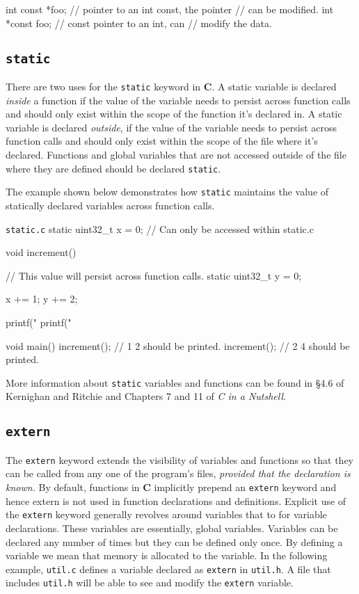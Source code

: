 \documentclass[11pt]{article}
\begin{document}
\begin{codelisting}{}
int const *foo; // pointer to an int const, the pointer 
                // can be modified.
int *const foo; // const pointer to an int, can 
                // modify the data.
\end{codelisting}


\subsection{\texttt{static}}

There are two uses for the \texttt{static} keyword in \textbf{C}. A static
variable is declared \emph{inside} a function if the value of the variable needs
to persist across function calls and should only exist within the scope of the
function it's declared in. A static variable is declared \emph{outside}, if the
value of the variable needs to persist across function calls and should only
exist within the scope of the file where it's declared.  Functions and global
variables that are not accessed outside of the file where they are defined
should be declared \texttt{static}.

The example shown below demonstrates how \texttt{static} maintains the value of
statically declared variables across function calls.

\begin{codelisting}{\texttt{static.c}}
static uint32_t x = 0; // Can only be accessed within static.c

void increment() {
    // This value will persist across function calls.
    static uint32_t y = 0;

    x += 1;
    y += 2;

    printf("%
    printf("%
}

void main() {
    increment(); // 1 2 should be printed.
    increment(); // 2 4 should be printed.
}
\end{codelisting}

More information about \texttt{static} variables and functions can be found in
\S 4.6 of Kernighan and Ritchie and Chapters 7 and 11 of \emph{C in a Nutshell}.


\subsection{\texttt{extern}}

The \texttt{extern} keyword extends the visibility of variables and functions so
that they can be called from any one of the program's files, \emph{provided that
the declaration is known.} By default, functions in \textbf{C} implicitly
prepend an \texttt{extern} keyword and hence extern is not used in function declarations and definitions. 
Explicit use of the \texttt{extern} keyword generally revolves around variables that to for variable declarations. 
These variables are essentially, global variables. Variables can be declared any number of times but they can 
be defined only once.  By defining a variable we mean that memory is allocated to the variable. In the following 
example, \texttt{util.c} defines a variable declared as \texttt{extern} in \texttt{util.h}. A file that includes \texttt{util.h} 
will be able to see and modify the \texttt{extern} variable. 
\end{document}

